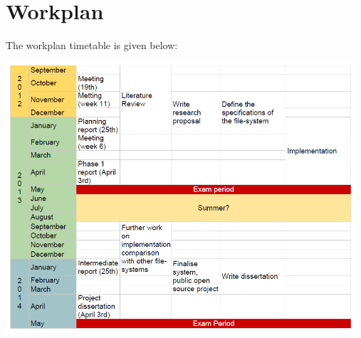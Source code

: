 \documentclass[8pt,a4paper]{article}
\begin{document}
\section{Workplan}

The workplan timetable is given below:

\begin{center}
\includegraphics[width=13cm]{timetable.png}
\end{center}
\end{document}
